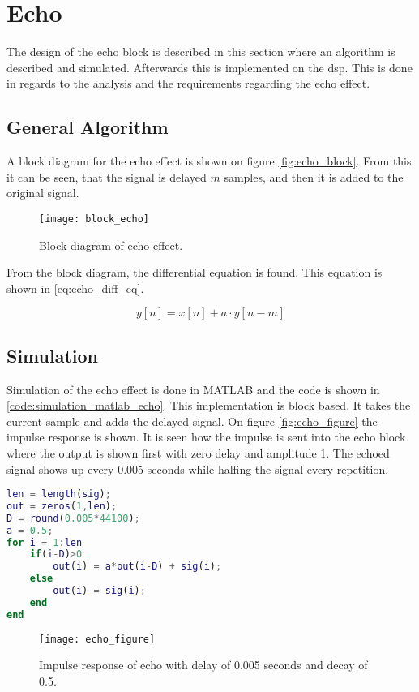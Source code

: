 \section{Echo}
\label{sec:echo_design}
The design of the echo block is described in this section where an algorithm is described and simulated. Afterwards this is implemented on the \gls{dsp}. This is done in regards to the analysis and the requirements regarding the echo effect.

\subsection{General Algorithm}
A block diagram for the echo effect is shown on figure \autoref{fig:echo_block}. From this it can be seen, that the signal is delayed $m$ samples, and then it is added to the original signal. 

\begin{figure}[htb]
	\centering
	\texttt{[image: block\_echo]}
	\caption{Block diagram of echo effect.}{
		\label{fig:echo_block}
	}
\end{figure}

From the block diagram, the differential equation is found. This equation is shown in \autoref{eq:echo_diff_eq}.

\begin{equation}\label{eq:echo_diff_eq}
y[n]=x[n]+a\cdot y[n-m]
\end{equation}

\subsection{Simulation}
Simulation of the echo effect is done in MATLAB and the code is shown in \autoref{code:simulation_matlab_echo}. This implementation is block based. It takes the current sample and adds the delayed signal. On figure \autoref{fig:echo_figure} the impulse response is shown. It is seen how the impulse is sent into the echo block where the output is shown first with zero delay and amplitude 1. The echoed signal shows up every 0.005 seconds while halfing the signal every repetition.

\begin{lstlisting}[caption={Simulation of echo in MATLAB.},language=MATLAB,label={code:simulation_matlab_echo}]
len = length(sig);
out = zeros(1,len);
D = round(0.005*44100);
a = 0.5;
for i = 1:len
    if(i-D)>0
        out(i) = a*out(i-D) + sig(i);
    else
        out(i) = sig(i);
    end
end
\end{lstlisting}

\begin{figure}[htb]
    \centering
    \texttt{[image: echo\_figure]}
    \caption{Impulse response of echo with delay of 0.005 seconds and decay of 0.5.}
    \label{fig:echo_figure}
\end{figure}


